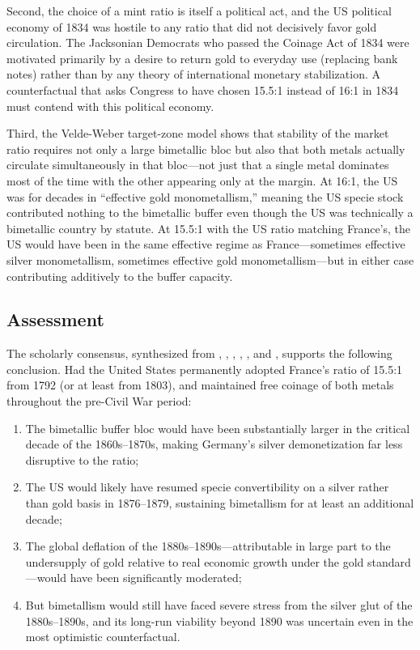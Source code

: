 \documentclass[12pt,letterpaper]{article}
\begin{document}
Second, the choice of a mint ratio is itself a political act, and the US political
economy of 1834 was hostile to any ratio that did not decisively favor gold
circulation.  The Jacksonian Democrats who passed the Coinage Act of 1834 were
motivated primarily by a desire to return gold to everyday use (replacing bank
notes) rather than by any theory of international monetary stabilization.
A counterfactual that asks Congress to have chosen 15.5:1 instead of 16:1 in 1834
must contend with this political economy.

Third, the Velde-Weber target-zone model shows that stability of the market ratio
requires not only a large bimetallic bloc but also that both metals actually
circulate simultaneously in that bloc---not just that a single metal dominates
most of the time with the other appearing only at the margin.  At 16:1, the US was
for decades in ``effective gold monometallism,'' meaning the US specie stock
contributed nothing to the bimetallic buffer even though the US was technically a
bimetallic country by statute.  At 15.5:1 with the US ratio matching France's, the
US would have been in the same effective regime as France---sometimes effective
silver monometallism, sometimes effective gold monometallism---but in either case
contributing additively to the buffer capacity.

\subsection{Assessment}

The scholarly consensus, synthesized from \citet{friedman1990jep},
\citet{flandreau1996,flandreau2004}, \citet{oppers1996,oppers2000},
\citet{velde_weber2000}, \citet{meissner2015}, and \citet{wiegand2022}, supports
the following conclusion.  Had the United States permanently adopted France's
ratio of 15.5:1 from 1792 (or at least from 1803), and maintained free coinage of
both metals throughout the pre-Civil War period:
\begin{enumerate}
  \item The bimetallic buffer bloc would have been substantially larger in the
  critical decade of the 1860s--1870s, making Germany's silver demonetization far
  less disruptive to the ratio;
  \item The US would likely have resumed specie convertibility on a silver rather
  than gold basis in 1876--1879, sustaining bimetallism for at least an additional
  decade;
  \item The global deflation of the 1880s--1890s---attributable in large part to
  the undersupply of gold relative to real economic growth under the gold
  standard---would have been significantly moderated;
  \item But bimetallism would still have faced severe stress from the silver glut
  of the 1880s--1890s, and its long-run viability beyond 1890 was uncertain even
  in the most optimistic counterfactual.
\end{enumerate}
\end{document}
